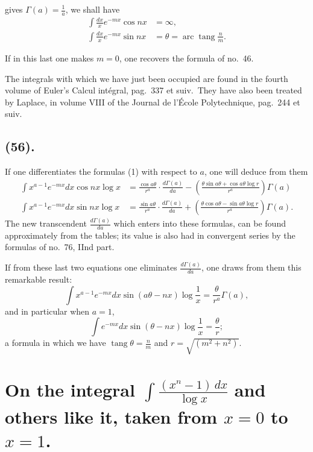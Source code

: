 \documentclass{article}
\begin{document}
gives $\Gamma(a)=\frac{1}{a}$, we shall have
\[ \begin{aligned} \int\frac{dx}{x}e^{-mx}\cos nx&=\infty,\\ \int\frac{dx}{x}e^{-mx}\sin nx&=\theta=\operatorname{arc}\operatorname{tang}\frac{n}{m}. \end{aligned} \tag{4} \]

If in this last one makes $m=0$, one recovers the formula of no.\ 46.

The integrals with which we have just been occupied are found in the fourth volume of Euler's Calcul intégral, pag.\ 337 et suiv.\ They have also been treated by Laplace, in volume VIII of the Journal de l'École Polytechnique, pag.\ 244 et suiv.

\subsection*{(56).}

If one differentiates the formulas (1) with respect to $a$, one will deduce from them
\[ \begin{aligned} \int x^{a-1}e^{-mx}dx\cos nx\log x&=\frac{\cos a\theta}{r^{a}}\cdot\frac{d\Gamma(a)}{da}-\left(\frac{\theta\sin a\theta+\cos a\theta\log r}{r^{a}}\right)\Gamma(a)\\ \int x^{a-1}e^{-mx}dx\sin nx\log x&=\frac{\sin a\theta}{r^{a}}\cdot\frac{d\Gamma(a)}{da}+\left(\frac{\theta\cos a\theta-\sin a\theta\log r}{r^{a}}\right)\Gamma(a). \end{aligned} \tag{5} \]
The new transcendent $\frac{d\Gamma(a)}{da}$ which enters into these formulas, can be found approximately from the tables; its value is also had in convergent series by the formulas of no.\ 76, IInd part.

If from these last two equations one eliminates $\frac{d\Gamma(a)}{da}$, one draws from them this remarkable result:
\[ \int x^{a-1}e^{-mx}dx\sin(a\theta-nx)\log\frac{1}{x}=\frac{\theta}{r^{a}}\Gamma(a), \tag{6} \]
and in particular when $a=1$,
\[ \int e^{-mx}dx\sin(\theta-nx)\log\frac{1}{x}=\frac{\theta}{r}; \tag{7} \]
a formula in which we have $\operatorname{tang}\theta=\frac{n}{m}$ and $r=\sqrt{(m^{2}+n^{2})}$.


\section*{On the integral $\displaystyle\int\frac{(x^{n}-1)\,dx}{\log x}$ and others like it, taken from $x=0$ to $x=1$.}
\end{document}
